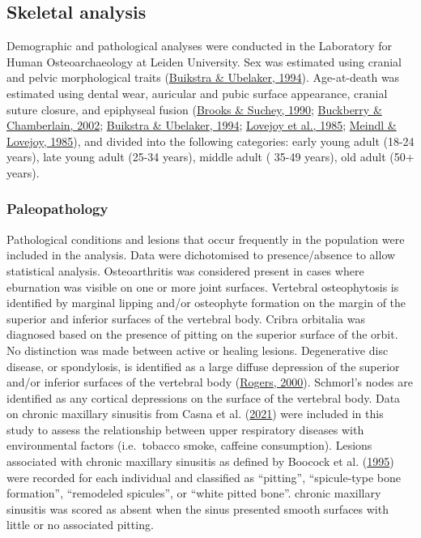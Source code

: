 \documentclass[
  b5paper,
]{book}
\begin{document}
\hypertarget{skeletal-analysis}{%
\subsection{Skeletal analysis}\label{skeletal-analysis}}

Demographic and pathological analyses were conducted in the Laboratory
for Human Osteoarchaeology at Leiden University. Sex was estimated using
cranial and pelvic morphological traits
(\protect\hyperlink{ref-Standards1994}{Buikstra \& Ubelaker, 1994}).
Age-at-death was estimated using dental wear, auricular and pubic
surface appearance, cranial suture closure, and epiphyseal fusion
(\protect\hyperlink{ref-SucheyBrooks1990}{Brooks \& Suchey, 1990};
\protect\hyperlink{ref-buckberryAuricular2002}{Buckberry \& Chamberlain,
2002}; \protect\hyperlink{ref-Standards1994}{Buikstra \& Ubelaker,
1994}; \protect\hyperlink{ref-lovejoyAuricular1985}{Lovejoy et al.,
1985}; \protect\hyperlink{ref-meindlSutureClosure1985}{Meindl \&
Lovejoy, 1985}), and divided into the following categories: early young
adult (18-24 years), late young adult (25-34 years), middle adult (
35-49 years), old adult (50+ years).

\hypertarget{paleopathology}{%
\subsubsection{Paleopathology}\label{paleopathology}}

Pathological conditions and lesions that occur frequently in the
population were included in the analysis. Data were dichotomised to
presence/absence to allow statistical analysis. Osteoarthritis was
considered present in cases where eburnation was visible on one or more
joint surfaces. Vertebral osteophytosis is identified by marginal
lipping and/or osteophyte formation on the margin of the superior and
inferior surfaces of the vertebral body. Cribra orbitalia was diagnosed
based on the presence of pitting on the superior surface of the orbit.
No distinction was made between active or healing lesions. Degenerative
disc disease, or spondylosis, is identified as a large diffuse
depression of the superior and/or inferior surfaces of the vertebral
body (\protect\hyperlink{ref-rogersPalaeopathologyJoint2000}{Rogers,
2000}). Schmorl's nodes are identified as any cortical depressions on
the surface of the vertebral body. Data on chronic maxillary sinusitis
from Casna et al.
(\protect\hyperlink{ref-casnaUrbanizationRespiratory2021}{2021}) were
included in this study to assess the relationship between upper
respiratory diseases with environmental factors (i.e.~tobacco smoke,
caffeine consumption). Lesions associated with chronic maxillary
sinusitis as defined by Boocock et al.
(\protect\hyperlink{ref-boocockMaxillarySinusitis1995}{1995}) were
recorded for each individual and classified as ``pitting'',
``spicule-type bone formation'', ``remodeled spicules'', or ``white
pitted bone''. chronic maxillary sinusitis was scored as absent when the
sinus presented smooth surfaces with little or no associated pitting.
\end{document}

